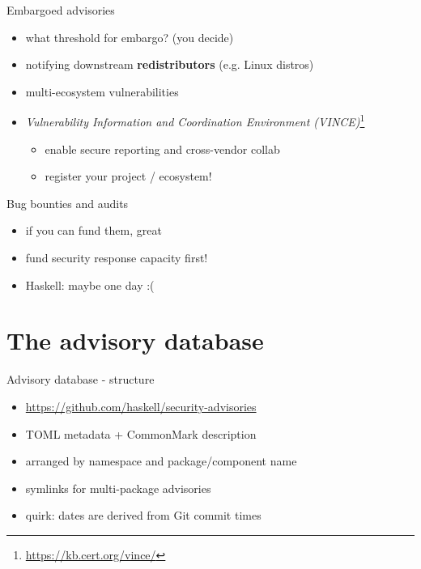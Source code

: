 \documentclass[ignorenonframetext,aspectratio=169,12pt]{beamer}
\begin{document}
\begin{frame}{Embargoed advisories}
  \begin{itemize}
    \item what threshold for embargo? (you decide)
    \item notifying downstream {\bf redistributors} (e.g. Linux distros)
    \item multi-ecosystem vulnerabilities
    \item {\em Vulnerability Information and Coordination
      Environment (VINCE)}\footnote{\url{https://kb.cert.org/vince/}}
      \begin{itemize}
        \item enable secure reporting and cross-vendor collab
        \item register your project / ecosystem!
      \end{itemize}
  \end{itemize}
\end{frame}

\begin{frame}{Bug bounties and audits}
  \begin{itemize}
    \item if you can fund them, great
    \item fund security response capacity first!
    \item Haskell: maybe one day :(
  \end{itemize}
\end{frame}



\section{The advisory database}

\begin{frame}{Advisory database - structure}
  \begin{itemize}
    \item \url{https://github.com/haskell/security-advisories}
    \item TOML metadata + CommonMark description
    \item arranged by namespace and package/component name
    \item symlinks for multi-package advisories
    \item quirk: dates are derived from Git commit times
  \end{itemize}
\end{frame}
\end{document}
